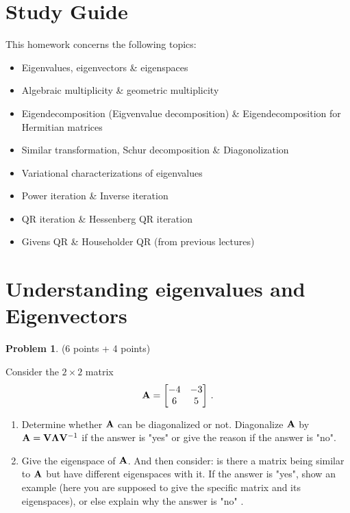 \documentclass[english,onecolumn]{IEEEtran}
\newcommand{\bA}{{\bf A}}
\begin{document}
\section*{Study Guide}
\noindent
This homework concerns the following topics:
\begin{itemize}
    \item Eigenvalues, eigenvectors \& eigenspaces 
    \item Algebraic multiplicity \& geometric multiplicity
    \item Eigendecomposition (Eigvenvalue decomposition) \& Eigendecomposition for Hermitian matrices
    \item Similar transformation, Schur decomposition \& 
    Diagonolization
    \item Variational characterizations of eigenvalues
	\item Power iteration \& Inverse iteration
	\item QR iteration \& Hessenberg QR iteration
	\item Givens QR \& Householder QR (from previous lectures)
\end{itemize}


\newpage 
\section{Understanding eigenvalues and Eigenvectors}

\noindent\textbf{Problem 1}. {\color{blue}(6 points + 4 points)}

\noindent
Consider the $2\times 2$ matrix \[ {\bf A} = \begin{bmatrix}
           -4 & -3 \\
            6 & 5
    \end{bmatrix}\,.    \]
\begin{enumerate}
    \item 
    Determine whether $\bA$ can be diagonalized or not. Diagonalize $\bA$ by ${\bf A} = {\bf V}{\bf \Lambda}{\bf V}^{-1}$ if the answer is "yes" or give the reason if the answer is "no".
    
    \item  Give the eigenspace of ${\bf A}$. 
    And then consider: 
    is there a matrix being similar to ${\bf A}$  but have different eigenspaces with it.
    If the answer is "yes", show an example (here you are supposed to give the specific matrix and its eigenspaces), or else explain why the answer is "no" .
\end{enumerate}
\end{document}
